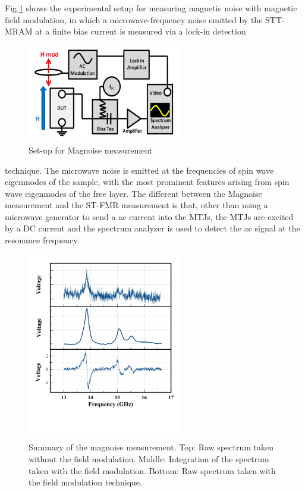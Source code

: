 Fig.\ref{fig:magnoise-setup} shows the experimental setup for measuring magnetic noise with magnetic field modulation, in which a microwave-frequency noise emitted by the STT-MRAM at a finite bias current is measured via a lock-in detection

\begin{figure}[!ht]
  \centering
  \includegraphics[width=0.6\textwidth]{fig/magnoise/Picture1.png}
   \caption{Set-up for Magnoise measurement}
  \label{fig:magnoise-setup}
\end{figure}

technique. The microwave noise is emitted at the frequencies of spin wave eigenmodes of the sample, with the most prominent features arising from spin wave eigenmodes of the free layer. The different between the Magnoise measurement and the ST-FMR measurement is that, other than using a microwave generator to send a ac current into the MTJs, the MTJs are excited by a DC current and the spectrum analyzer is used to detect the ac signal at the resonance frequency.

\begin{figure}[!ht]
  \centering
  \includegraphics[width=0.6\textwidth]{fig/magnoise/magnoise-data.png}
   \caption{Summary of the magnoise measurement. Top: Raw spectrum taken without the field modulation. Middle: Integration of the spectrum taken with the field modulation. Bottom: Raw spectrum taken with the field modulation technique.}
  \label{fig:magnoisedata}
\end{figure}


